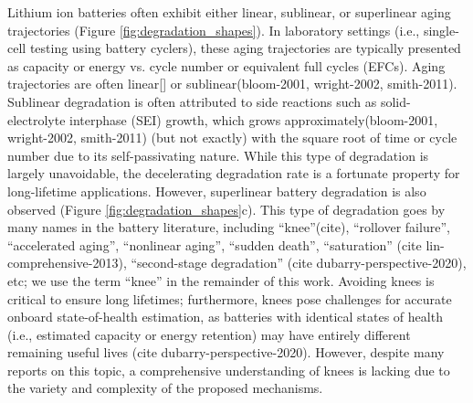 \documentclass[journal=jpcl, manuscript=article, layout=onecolumn]{achemso}
\begin{document}
Lithium ion batteries often exhibit either linear, sublinear, or superlinear aging trajectories (Figure \ref{fig:degradation_shapes}). In laboratory settings (i.e., single-cell testing using battery cyclers), these aging trajectories are typically presented as capacity or energy vs. cycle number or equivalent full cycles (EFCs). Aging trajectories are often linear[] or sublinear\cite{broussely_aging_2001, attia_revisiting_2020}(bloom-2001, wright-2002, smith-2011). Sublinear degradation is often attributed to side reactions such as solid-electrolyte interphase (SEI) growth, which grows approximately\cite{broussely_aging_2001}(bloom-2001, wright-2002, smith-2011) (but not exactly\cite{attia_revisiting_2020}) with the square root of time or cycle number due to its self-passivating nature. While this type of degradation is largely unavoidable, the decelerating degradation rate is a fortunate property for long-lifetime applications. However, superlinear battery degradation is also observed (Figure \ref{fig:degradation_shapes}c). This type of degradation goes by many names in the battery literature, including ``knee''(cite), ``rollover failure''\cite{ma_editors_2019}, ``accelerated aging'', ``nonlinear aging''\cite{schuster_nonlinear_2015, bach_nonlinear_2016, yang_modeling_2017, mandli_analysis_2019, keil_linear_2019, atalay_theory_2020}, ``sudden death''\cite{muller_model-based_2019, willenberg_development_2020}, ``saturation'' (cite lin-comprehensive-2013), ``second-stage degradation'' (cite dubarry-perspective-2020), etc; we use the term ``knee'' in the remainder of this work. Avoiding knees is critical to ensure long lifetimes; furthermore, knees pose challenges for accurate onboard state-of-health estimation, as batteries with identical states of health (i.e., estimated capacity or energy retention) may have entirely different remaining useful lives (cite dubarry-perspective-2020). However, despite many reports on this topic, a comprehensive understanding of knees is lacking due to the variety and complexity of the proposed mechanisms.
\end{document}
